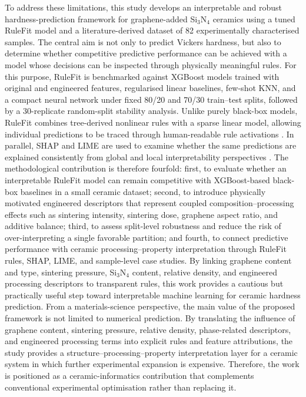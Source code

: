 \documentclass[pdflatex,sn-mathphys-num]{sn-jnl}%
\newif\ifrevmarks%
\newcommand{\revmark}[1]{\ifrevmarks\textcolor{revblue}{#1}\else#1\fi}%
\theoremstyle{thmstyleone}%
\theoremstyle{thmstyletwo}%
\theoremstyle{thmstylethree}%
\begin{document}
\revmark{To address these limitations, this study develops an interpretable and robust hardness-prediction framework for graphene-added Si$_3$N$_4$ ceramics using a tuned RuleFit model and a literature-derived dataset of 82 experimentally characterised samples. The central aim is not only to predict Vickers hardness, but also to determine whether competitive predictive performance can be achieved with a model whose decisions can be inspected through physically meaningful rules. For this purpose, RuleFit is benchmarked against XGBoost models trained with original and engineered features, regularised linear baselines, few-shot KNN, and a compact neural network under fixed 80/20 and 70/30 train--test splits, followed by a 30-replicate random-split stability analysis. Unlike purely black-box models, RuleFit combines tree-derived nonlinear rules with a sparse linear model, allowing individual predictions to be traced through human-readable rule activations \cite{friedman2008predictive}. In parallel, SHAP and LIME are used to examine whether the same predictions are explained consistently from global and local interpretability perspectives \cite{lundberg2017unified, ribeiro2016should}. The methodological contribution is therefore fourfold: first, to evaluate whether an interpretable RuleFit model can remain competitive with XGBoost-based black-box baselines in a small ceramic dataset; second, to introduce physically motivated engineered descriptors that represent coupled composition--processing effects such as sintering intensity, sintering dose, graphene aspect ratio, and additive balance; third, to assess split-level robustness and reduce the risk of over-interpreting a single favorable partition; and fourth, to connect predictive performance with ceramic processing--property interpretation through RuleFit rules, SHAP, LIME, and sample-level case studies. By linking graphene content and type, sintering pressure, Si$_3$N$_4$ content, relative density, and engineered processing descriptors to transparent rules, this work provides a cautious but practically useful step toward interpretable machine learning for ceramic hardness prediction. From a materials-science perspective, the main value of the proposed framework is not limited to numerical prediction. By translating the influence of graphene content, sintering pressure, relative density, phase-related descriptors, and engineered processing terms into explicit rules and feature attributions, the study provides a structure--processing--property interpretation layer for a ceramic system in which further experimental expansion is expensive. Therefore, the work is positioned as a ceramic-informatics contribution that complements conventional experimental optimisation rather than replacing it.}
\end{document}
